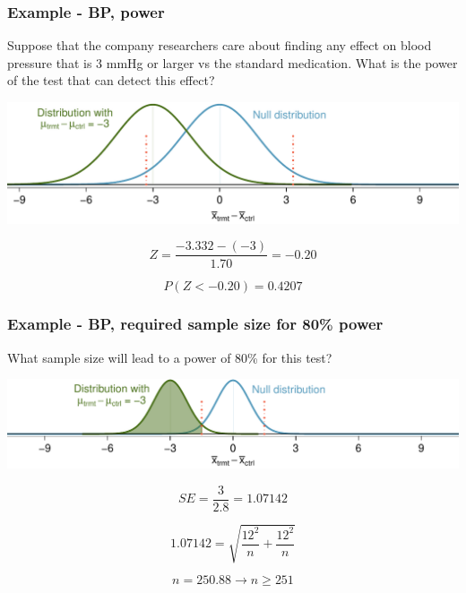 \begin{frame}
\frametitle{Example - BP, power}

{\dq
{\footnotesize
Suppose that the company researchers care about finding any effect on blood pressure that is 3 mmHg or larger vs the standard medication. What is the power of the test that can detect this effect?
}}

\pause

\includegraphics[width=\textwidth]{5-4_power/figures/power/power_null_C_0_1-7_with_alt_at_3}

\pause

\[ Z = \frac{-3.332 - (-3)}{1.70} = -0.20 \]

\pause

\[ P(Z < -0.20) = 0.4207 \]

\end{frame}


\begin{frame}
\frametitle{Example - BP, required sample size for 80\% power}

{\dq
{\footnotesize
What sample size will lead to a power of 80\% for this test?
}}

\pause

\includegraphics[width=\textwidth]{5-4_power/figures/power/power_null_0_0-76_with_alt_at_3_and_shaded}

\pause

\[ SE = \frac{3}{2.8} = 1.07142 \]

\pause

\[ 1.07142 = \sqrt{ \frac{12^2}{n} + \frac{12^2}{n} } \]

\pause

\[ n = 250.88 \rightarrow n \ge 251 \]

\end{frame}

